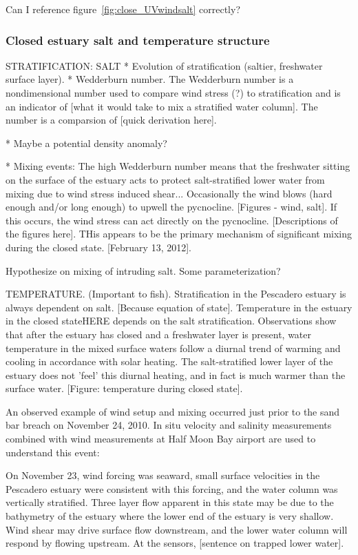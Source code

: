 
Can I reference figure~\ref{fig:close_UVwindsalt} correctly?


\subsubsection{Closed estuary salt and temperature structure} \label{cl_strat}
STRATIFICATION: SALT * Evolution of stratification (saltier, freshwater
surface layer). * Wedderburn number. The Wedderburn number is a
nondimensional number used to compare wind stress (?) to stratification
and is an indicator of [what it would take to mix a stratified water
column]. The number is a comparsion of [quick derivation here].


* Maybe a potential density anomaly?


* Mixing events: The high Wedderburn number means that the freshwater
sitting on the surface of the estuary acts to protect salt-stratified
lower water from mixing due to wind stress induced shear... Occasionally
the wind blows (hard enough and/or long enough) to upwell the
pycnocline. [Figures - wind, salt]. If this occurs, the wind stress can
act directly on the pycnocline. [Descriptions of the figures here]. 
THis appears to be the primary mechanism of significant mixing during
the closed state.  [February 13, 2012].



Hypothesize on mixing of intruding salt. Some parameterization?

TEMPERATURE. (Important to fish). Stratification in the Pescadero
estuary is always dependent on salt. [Because equation of state].
Temperature in the estuary in the closed state{HERE} depends on the salt
stratification. Observations show that after the estuary has closed and
a freshwater layer is present, water temperature in the mixed surface
waters follow a diurnal trend of warming and cooling in accordance with
solar heating. The salt-stratified lower layer of the estuary does not
'feel' this diurnal heating, and in fact is much warmer than the surface
water. [Figure: temperature during closed state].


An observed example of wind setup and mixing occurred just prior to the
sand bar breach on November 24, 2010. In situ velocity and salinity
measurements combined with wind measurements at Half Moon Bay airport
are used to understand this event:

On November 23, wind forcing was seaward, small surface velocities in
the Pescadero estuary were consistent with this forcing, and the water
column was vertically stratified. Three layer flow apparent in this
state may be due to the bathymetry of the estuary where the lower end of
the estuary is very shallow. Wind shear may drive surface flow
downstream, and the lower water column will respond by flowing upstream.
At the sensors, [sentence on trapped lower water].

